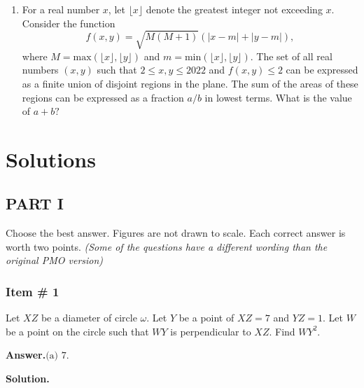 \documentclass[11pt,paper=letter]{scrartcl}
\newcommand{\ans}[1]{{\sffamily \bfseries Answer.}\;\(\boxed{\text{#1}}\).}
\newcommand{\sol}{{\sffamily \bfseries Solution.}\;}
\begin{document}
\begin{enumerate}[resume, label=\arabic*.,font=\bfseries]
    \newpage
    
    \item For a real number $x$, let $\lfloor x \rfloor$ denote the greatest integer not exceeding $x$. Consider the function $$f(x,y) = \sqrt{M(M+1)}\left(|x-m|+|y-m|\right),$$ where $M = \text{max} (\lfloor x \rfloor, \lfloor y \rfloor)$ and $m = \text{min} (\lfloor x \rfloor, \lfloor y \rfloor)$. The set of all real numbers $(x,y)$ such that $2 \leq x, y \leq 2022$ and $f(x,y) \leq 2$ can be expressed as a finite union of disjoint regions in the plane. The sum of the areas of these regions can be expressed as a fraction $a/b$ in lowest terms. What is the value of $a+b?$
    
    
\end{enumerate}

\newpage

\section{Solutions}

\subsection{PART I}

Choose the best answer. Figures are not drawn to scale. Each correct answer is worth two points. \textit{(Some of the questions have a different wording than the original PMO version)}

\vspace{2mm}

\subsubsection{Item \# 1}

\begin{probboxed}
 Let $XZ$ be a diameter of circle $\omega$. Let $Y$ be a point of $XZ=7$ and $YZ=1.$ Let $W$ be a point on the circle such that $WY$ is perpendicular to $XZ$. Find $WY^2$.
    
\end{probboxed}

\ans{(a) 7}

\sol
\end{document}
